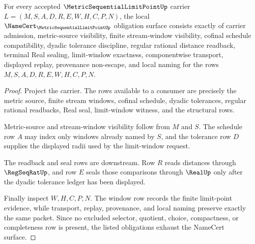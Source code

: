 \begin{theorem}
\label{thm:metric-sequential-limit-point-namecert-obligations}
For every accepted $\MetricSequentialLimitPointUp$ carrier $L=(M,S,A,D,R,E,W,H,C,P,N)$, the local $\NameCert_{\MetricSequentialLimitPointUp}$ obligation surface consists exactly of carrier admission, metric-source visibility, finite stream-window visibility, cofinal schedule compatibility, dyadic tolerance discipline, regular rational distance readback, terminal Real sealing, limit-window exactness, componentwise transport, displayed replay, provenance non-escape, and local naming for the rows $M,S,A,D,R,E,W,H,C,P,N$.
\end{theorem}
\begin{proof}
Project the carrier. The rows available to a consumer are precisely the metric source, finite stream windows, cofinal schedule, dyadic tolerances, regular rational readbacks, Real seal, limit-window witness, and the structural rows.

Metric-source and stream-window visibility follow from $M$ and $S$. The schedule row $A$ may index only windows already named by $S$, and the tolerance row $D$ supplies the displayed radii used by the limit-window request.

The readback and seal rows are downstream. Row $R$ reads distances through $\RegSeqRatUp$, and row $E$ seals those comparisons through $\RealUp$ only after the dyadic tolerance ledger has been displayed.

Finally inspect $W,H,C,P,N$. The window row records the finite limit-point evidence, while transport, replay, provenance, and local naming preserve exactly the same packet. Since no excluded selector, quotient, choice, compactness, or completeness row is present, the listed obligations exhaust the NameCert surface.
\end{proof}


